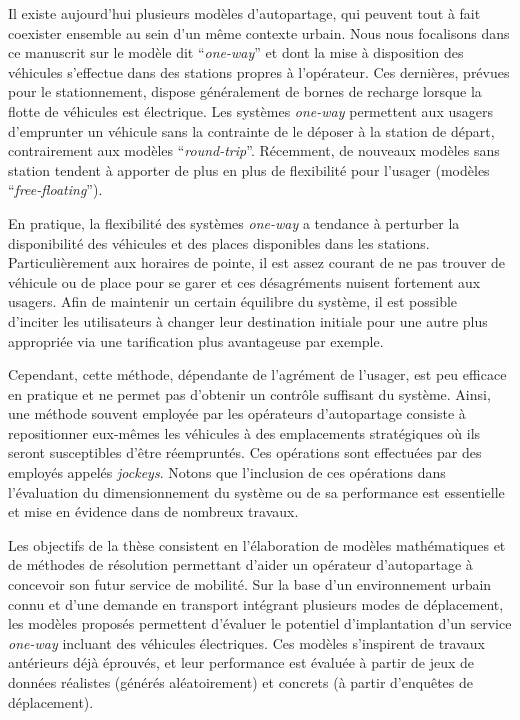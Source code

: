 \medskip
Il existe aujourd'hui plusieurs modèles d'autopartage, qui peuvent tout à fait coexister ensemble au sein d'un même contexte urbain.
Nous nous focalisons dans ce manuscrit sur le modèle dit ``\emph{one-way}'' et dont la mise à disposition des véhicules s'effectue dans des stations propres à l'opérateur.
Ces dernières, prévues pour le stationnement, dispose généralement de bornes de recharge lorsque la flotte de véhicules est électrique.
Les systèmes \emph{one-way} permettent aux usagers d’emprunter un véhicule sans la contrainte de le déposer à la station de départ, contrairement aux modèles ``\emph{round-trip}''.
Récemment, de nouveaux modèles sans station tendent à apporter de plus en plus de flexibilité pour l'usager (modèles ``\emph{free-floating}'').

\medskip
En pratique, la flexibilité des systèmes \emph{one-way} a tendance à perturber la disponibilité des véhicules et des places disponibles dans les stations.
Particulièrement aux horaires de pointe, il est assez courant de ne pas trouver de véhicule ou de place pour se garer et ces désagréments nuisent fortement aux usagers.
Afin de maintenir un certain équilibre du système, il est possible d'inciter les utilisateurs à changer leur destination initiale pour une autre plus appropriée via une tarification plus avantageuse par exemple.

Cependant, cette méthode, dépendante de l'agrément de l'usager, est peu efficace en pratique et ne permet pas d'obtenir un contrôle suffisant du système.
Ainsi, une méthode souvent employée par les opérateurs d’autopartage consiste à repositionner eux-mêmes les véhicules à des emplacements stratégiques où ils seront susceptibles d’être réempruntés.
Ces opérations sont effectuées par des employés appelés \emph{jockeys}.
Notons que l'inclusion de ces opérations dans l’évaluation du dimensionnement du système ou de sa performance est essentielle et mise en évidence dans de nombreux travaux.

\medskip
Les objectifs de la thèse consistent en l'élaboration de modèles mathématiques et de méthodes de résolution permettant d'aider un opérateur d'autopartage à concevoir son futur service de mobilité.
Sur la base d'un environnement urbain connu et d'une demande en transport intégrant plusieurs modes de déplacement, les modèles proposés permettent d'évaluer le potentiel d'implantation d'un service \emph{one-way} incluant des véhicules électriques.
Ces modèles s'inspirent de travaux antérieurs déjà éprouvés, et leur performance est évaluée à partir de jeux de données réalistes (générés aléatoirement) et concrets (à partir d'enquêtes de déplacement).


